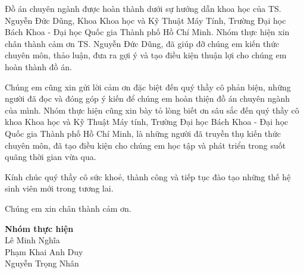 \begin{acknowledgments}

Đồ án chuyên ngành được hoàn thành dưới sự hướng dẫn khoa học của TS. Nguyễn Đức Dũng, Khoa Khoa học và Kỹ Thuật Máy Tính, Trường Đại học Bách Khoa - Đại học Quốc
gia Thành phố Hồ Chí Minh. Nhóm thực hiện xin chân thành cảm ơn TS. Nguyễn Đức Dũng, đã giúp đỡ chúng em kiến thức chuyên môn, thảo luận, đưa ra gợi ý và tạo điều kiện thuận lợi cho chúng em hoàn thành đồ án.

Chúng em cũng xin gửi lời cảm ơn đặc biệt đến quý thầy cô phản biện, những người
đã đọc và đóng góp ý kiến để chúng em hoàn thiện đồ án chuyên ngành của mình.
Nhóm thực hiện cũng xin bày tỏ lòng biết ơn sâu sắc đến quý thầy cô khoa Khoa
học và Kỹ Thuật Máy tính, Trường Đại học Bách Khoa - Đại học Quốc gia Thành phố
Hồ Chí Minh, là những người đã truyền thụ kiến thức chuyên môn, đã tạo điều kiện cho chúng em học tập và phát triển trong suốt quãng thời gian vừa qua.

Kính chúc quý thầy cô sức khoẻ, thành công và tiếp tục đào tạo những thế hệ sinh
viên mới trong tương lai.

Chúng em xin chân thành cảm ơn.

\begin{flushright}
\textbf{Nhóm thực hiện} \\
Lê Minh Nghĩa \\ 
Phạm Khai Anh Duy \\
Nguyễn Trọng Nhân \\
\end{flushright} 

\end{acknowledgments}